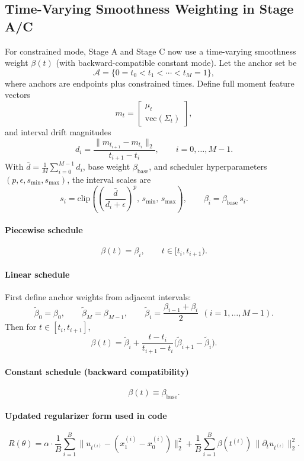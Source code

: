 \documentclass[11pt]{article}
\begin{document}
\subsection{Time-Varying Smoothness Weighting in Stage A/C}
For constrained mode, Stage A and Stage C now use a time-varying smoothness weight $\beta(t)$ (with backward-compatible constant mode).
Let the anchor set be
\[
\mathcal{A}=\{0=t_0<t_1<\cdots<t_M=1\},
\]
where anchors are endpoints plus constrained times.
Define full moment feature vectors
\[
m_t=\begin{bmatrix}\mu_t\\ \mathrm{vec}(\Sigma_t)\end{bmatrix},
\]
and interval drift magnitudes
\[
d_i=\frac{\|m_{t_{i+1}}-m_{t_i}\|_2}{t_{i+1}-t_i},\qquad i=0,\dots,M-1.
\]
With $\bar d=\frac{1}{M}\sum_{i=0}^{M-1} d_i$, base weight $\beta_{\mathrm{base}}$, and scheduler hyperparameters $(p,\epsilon,s_{\min},s_{\max})$, the interval scales are
\[
s_i=
\mathrm{clip}\!\left(
\left(\frac{\bar d}{d_i+\epsilon}\right)^p,\,
s_{\min},\,s_{\max}
\right),
\qquad
\beta_i=\beta_{\mathrm{base}}\,s_i.
\]

\paragraph{Piecewise schedule}
\[
\beta(t)=\beta_i,\qquad t\in[t_i,t_{i+1}).
\]

\paragraph{Linear schedule}
First define anchor weights from adjacent intervals:
\[
\tilde\beta_0=\beta_0,\qquad
\tilde\beta_M=\beta_{M-1},\qquad
\tilde\beta_i=\frac{\beta_{i-1}+\beta_i}{2}\ \ (i=1,\dots,M-1).
\]
Then for $t\in[t_i,t_{i+1}]$,
\[
\beta(t)=
\tilde\beta_i
+
\frac{t-t_i}{t_{i+1}-t_i}\bigl(\tilde\beta_{i+1}-\tilde\beta_i\bigr).
\]

\paragraph{Constant schedule (backward compatibility)}
\[
\beta(t)\equiv \beta_{\mathrm{base}}.
\]

\paragraph{Updated regularizer form used in code}
\[
R(\theta)=
\alpha\cdot\frac{1}{B}\sum_{i=1}^B\|u_{t^{(i)}}-(x_1^{(i)}-x_0^{(i)})\|_2^2
+
\frac{1}{B}\sum_{i=1}^B\beta(t^{(i)})\,\|\partial_t u_{t^{(i)}}\|_2^2.
\]
\end{document}

